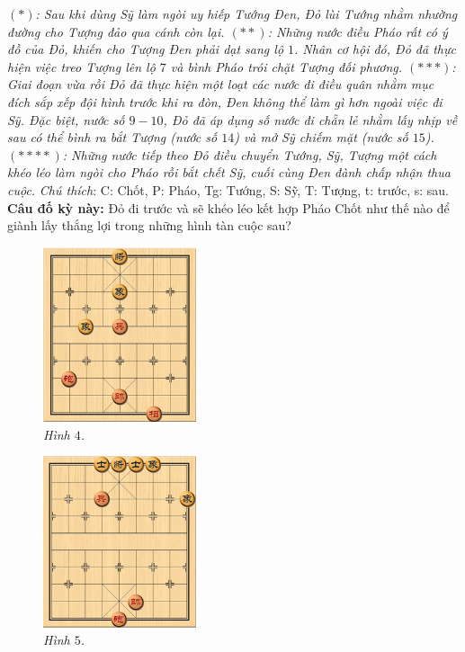 \begin{multicols}{2}
	\vskip 0.1cm
	\textit{$(*)$: Sau khi dùng Sỹ làm ngòi uy hiếp Tướng Đen, Đỏ lùi Tướng nhằm nhường đường cho Tượng đảo qua cánh còn lại.
	\vskip 0.1cm
	$(**)$: Những nước điều Pháo rất có ý đồ của Đỏ, khiến cho Tượng Đen phải dạt sang lộ $1$. Nhân cơ hội đó, Đỏ đã thực hiện việc treo Tượng lên lộ $7$ và bình Pháo trói chặt Tượng đối phương.
	\vskip 0.1cm
	$(***)$: Giai đoạn vừa rồi Đỏ đã thực hiện một loạt các nước đi điều quân nhằm mục đích sắp xếp đội hình trước khi ra đòn, Đen không thể làm gì hơn ngoài việc đi Sỹ. Đặc biệt, nước số $9-10$, Đỏ đã áp dụng số nước đi chẵn lẻ nhằm lấy nhịp về sau có thể bình ra bắt Tượng (nước số $14$) và mở Sỹ chiếm mặt (nước số $15$).
	\vskip 0.1cm
	$(****)$: Những nước tiếp theo Đỏ điều chuyển Tướng, Sỹ, Tượng một cách khéo léo làm ngòi cho Pháo rồi bắt chết Sỹ, cuối cùng Đen đành chấp nhận thua cuộc.}
	\vskip 0.1cm
	\columnbreak
	\textit{Chú thích}: C: Chốt, P: Pháo, Tg: Tướng, S: Sỹ, T: Tượng, t: trước, s: sau.
	\vskip 0.1cm
	\textbf{\color{gocco}Câu đố kỳ này:} Đỏ đi trước và sẽ khéo léo kết hợp Pháo Chốt như thế nào để giành lấy thắng lợi trong những hình tàn cuộc sau?
	\begin{figure}[H]
		\vspace*{-5pt}
		\centering
		\captionsetup{labelformat= empty, justification=centering}
		\includegraphics[width= 0.4\textwidth]{4}
		\caption{\small\textit{\color{gocco}Hình $4$.}}
		\vspace*{-10pt}
	\end{figure}
	\begin{figure}[H]
		\vspace*{-10pt}
		\centering
		\captionsetup{labelformat= empty, justification=centering}
		\includegraphics[width= 0.4\textwidth]{5}
		\caption{\small\textit{\color{gocco}Hình $5$.}}
		\vspace*{-5pt}
	\end{figure}
\end{multicols}




